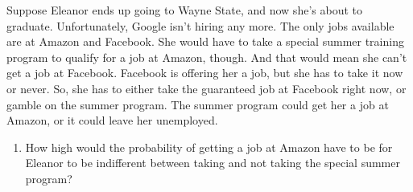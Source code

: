 \documentclass[11pt,]{article}
\providecommand{\tightlist}{%
  \setlength{\itemsep}{0pt}\setlength{\parskip}{0pt}}
\begin{document}
Suppose Eleanor ends up going to Wayne State, and now she's about to
graduate. Unfortunately, Google isn't hiring any more. The only jobs
available are at Amazon and Facebook. She would have to take a special
summer training program to qualify for a job at Amazon, though. And that
would mean she can't get a job at Facebook. Facebook is offering her a
job, but she has to take it now or never. So, she has to either take the
guaranteed job at Facebook right now, or gamble on the summer program.
The summer program could get her a job at Amazon, or it could leave her
unemployed.

\begin{enumerate}
\def\labelenumi{\arabic{enumi}.}
\setcounter{enumi}{16}
\tightlist
\item
  How high would the probability of getting a job at Amazon have to be
  for Eleanor to be indifferent between taking and not taking the
  special summer program?
\end{enumerate}
\end{document}
